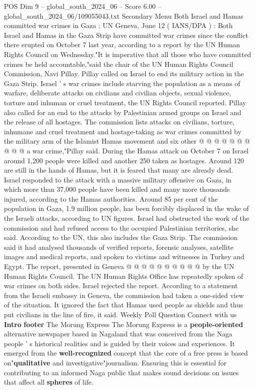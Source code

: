\begin{textsample}{POS Dim 9 – global\_south\_2024\_06 – Score 6.00 – global\_south\_2024\_06/109055043.txt}  \label{ex:f9_pos_051}
Secondary Menu Both Israel and Hamas committed war crimes in Gaza : UN Geneva, June 12 ( IANS/DPA ) : Both Israel and Hamas in the Gaza Strip have committed war crimes since the conflict there erupted on October 7 last year, according to a report by the UN Human Rights Council on Wednesday."It is imperative that all those who have committed crimes be held accountable,"said the chair of the UN Human Rights Council Commission, Navi Pillay.
Pillay called on Israel to end its military action in the Gaza Strip.
Israel ' s war crimes include starving the population as a means of warfare, deliberate attacks on civilians and civilian objects, sexual violence, torture and inhuman or cruel treatment, the UN Rights Council reported.
Pillay also called for an end to the attacks by Palestinian armed groups on Israel and the release of all hostages.
The commission lists attacks on civilians, torture, inhumane and cruel treatment and hostage-taking as war crimes committed by the military arm of the Islamist Hamas movement and six other @ @ @ @ @ @ @ @ @ @ a war crime,"Pillay said.
During the Hamas attack on October 7 on Israel around 1,200 people were killed and another 250 taken as hostages.
Around 120 are still in the hands of Hamas, but it is feared that many are already dead.
Israel responded to the attack with a massive military offensive on Gaza, in which more than 37,000 people have been killed and many more thousands injured, according to the Hamas authorities.
Around 85 per cent of the population in Gaza, 1.9 million people, has been forcibly displaced in the wake of the Israeli attacks, according to UN figures.
Israel had obstructed the work of the commission and had refused access to the occupied Palestinian territories, she said.
According to the UN, this also includes the Gaza Strip.
The commission said it had analysed thousands of verified reports, forensic analyses, satellite images and medical reports, and spoken to victims and witnesses in Turkey and Egypt.
The report, presented in Geneva @ @ @ @ @ @ @ @ @ @ by the UN Human Rights Council.
The UN Human Rights Office has repeatedly spoken of war crimes on both sides.
Israel rejected the report.
According to a statement from the Israeli embassy in Geneva, the commission had taken a one-sided view of the situation.
It ignored the fact that Hamas used people as shields and thus put civilians in the line of fire, it said.
Weekly Poll Question Connect with us \textbf{Intro} \textbf{footer} The Morung Express The Morung Express is a \textbf{people-oriented} alternative newspaper based in Nagaland that was conceived from the Naga people ' s historical realities and is guided by their voices and experiences.
It emerged from the \textbf{well-recognized} concept that the core of a free press is based on"\textbf{qualitative} and investigative"journalism.
Ensuring this is essential for contributing to an informed Naga public that makes sound decisions on issues that affect all \textbf{spheres} of life.

\end{textsample}
